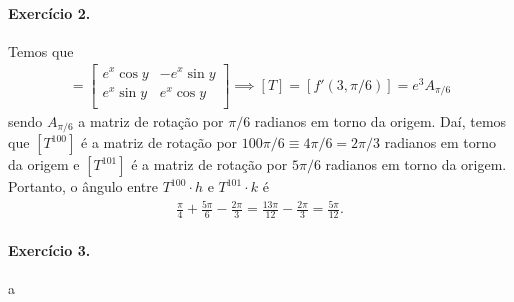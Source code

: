 \documentclass[12pt,a4paper]{article}
\begin{document}
\paragraph{Exercício 2.}
    Temos que
    \begin{align*}
        [f'(x,y)] = 
        \begin{bmatrix}
            e^x\cos y & -e^x\sin y \\
            e^x\sin y & e^x\cos y \\
        \end{bmatrix} 
        \implies
        [T] = [f'(3, \pi/6)] = 
        e^3A_{\pi/6}
    \end{align*}
    sendo $A_{\pi/6}$ a matriz de rotação por $\pi/6$ radianos em torno da origem. Daí, temos que $[T^{100}]$
    é a matriz de rotação por $100\pi/6 \equiv 4\pi/6 = 2\pi/3$ radianos em torno da origem e $[T^{101}]$ é
    a matriz de rotação por $5\pi/6$ radianos em torno da origem. Portanto, o ângulo entre $T^{100}\cdot h$ 
    e $T^{101}\cdot k$ é
    \begin{align*}
        \frac{\pi}{4} + \frac{5\pi}{6} - \frac{2\pi}{3} = \frac{13\pi}{12} - \frac{2\pi}{3} = \frac{5\pi}{12}.
    \end{align*}
\paragraph{Exercício 3.}
    a
%
\end{document}
